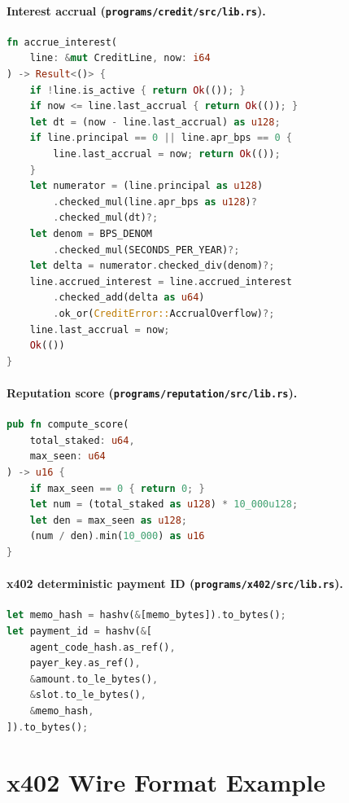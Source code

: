 \documentclass[10pt,conference,letterpaper]{IEEEtran}
\theoremstyle{definition}
\begin{document}
\paragraph{Interest accrual (\texttt{programs/credit/src/lib.rs}).}

\begin{lstlisting}[language=Rust]
fn accrue_interest(
    line: &mut CreditLine, now: i64
) -> Result<()> {
    if !line.is_active { return Ok(()); }
    if now <= line.last_accrual { return Ok(()); }
    let dt = (now - line.last_accrual) as u128;
    if line.principal == 0 || line.apr_bps == 0 {
        line.last_accrual = now; return Ok(());
    }
    let numerator = (line.principal as u128)
        .checked_mul(line.apr_bps as u128)?
        .checked_mul(dt)?;
    let denom = BPS_DENOM
        .checked_mul(SECONDS_PER_YEAR)?;
    let delta = numerator.checked_div(denom)?;
    line.accrued_interest = line.accrued_interest
        .checked_add(delta as u64)
        .ok_or(CreditError::AccrualOverflow)?;
    line.last_accrual = now;
    Ok(())
}
\end{lstlisting}

\paragraph{Reputation score (\texttt{programs/reputation/src/lib.rs}).}

\begin{lstlisting}[language=Rust]
pub fn compute_score(
    total_staked: u64,
    max_seen: u64
) -> u16 {
    if max_seen == 0 { return 0; }
    let num = (total_staked as u128) * 10_000u128;
    let den = max_seen as u128;
    (num / den).min(10_000) as u16
}
\end{lstlisting}

\paragraph{x402 deterministic payment ID
(\texttt{programs/x402/src/lib.rs}).}

\begin{lstlisting}[language=Rust]
let memo_hash = hashv(&[memo_bytes]).to_bytes();
let payment_id = hashv(&[
    agent_code_hash.as_ref(),
    payer_key.as_ref(),
    &amount.to_le_bytes(),
    &slot.to_le_bytes(),
    &memo_hash,
]).to_bytes();
\end{lstlisting}

\section{x402 Wire Format Example}\label{app:x402}
\end{document}
